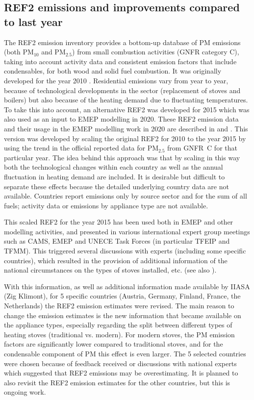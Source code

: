 \subsection{REF2 emissions and improvements compared to last year}


The REF2 emission inventory provides a bottom-up database of PM emissions (both PM$_{10}$ and PM$_{2.5}$) from small combustion activities (GNFR category C), taking into account activity data and consistent emission factors that include condensables, for both wood and solid fuel combustion. It was originally developed for the year 2010 \citep{DeniervanderGon2015}. Residential emissions vary from year to year, because of technological developments in the sector (replacement of stoves and boilers) but also because of the heating demand due to fluctuating temperatures. To take this into account, an alternative REF2 was developed for 2015 which was also used as an input to EMEP modelling in 2020. These REF2 emission data and their usage in the EMEP modelling work in 2020 are described in  \citet{R2020:SVOC} and \citet{R2020:CAMSREF2}. This version was developed by scaling the original REF2 for 2010 to the year 2015 by using the trend in the official reported data for PM$_{2.5}$ from GNFR~C for that particular year. The idea behind this approach was that by scaling in this way both the technological changes within each country as well as the annual fluctuation in heating demand are included. It is desirable but difficult to separate these effects because the detailed underlying country data are not available. Countries report emissions only by source sector and for the sum of all fuels; activity data or emissions by appliance type are not available.

This scaled REF2 for the year 2015 has been used both in EMEP and other modelling activities, and presented in various international expert group meetings such as CAMS, EMEP and UNECE Task Forces (in particular TFEIP and TFMM). This triggered several discussions with experts (including some specific countries), which resulted in the provision of additional information of the national circumstances on the types of stoves installed, etc. (see also \cite{CONDws2020}). 

With this information, as well as additional information made available by IIASA (Zig Klimont), for 5 specific countries (Austria, Germany, Finland, France, the Netherlands) the REF2 emission estimates were revised. The main reason to change the emission estimates is the new information that became available on the appliance types, especially regarding the split between different types of heating stoves (traditional vs. modern). For modern stoves, the PM emission factors are significantly lower compared to traditional stoves, and for the condensable component of PM this effect is even larger.
The 5 selected countries were chosen because of feedback received or discussions with national experts which suggested that REF2 emissions may be overestimating. It is planned to also revisit the REF2 emission estimates for the other countries, but this is ongoing work.

